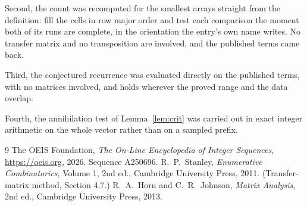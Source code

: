 \documentclass[11pt,a4paper]{article}
\theoremstyle{plain}
\theoremstyle{definition}
\begin{document}
Second, the count was recomputed for the smallest arrays straight from the definition: fill the
cells in row major order and test each comparison the moment both of its runs are complete,
in the orientation the entry's own name writes. No transfer matrix and no transposition are
involved, and the published terms came back.

Third, the conjectured recurrence was evaluated directly on the published terms, with no
matrices involved, and holds wherever the proved range and the data overlap.

Fourth, the annihilation test of Lemma~\ref{lem:crit} was carried out in exact integer
arithmetic on the whole vector rather than on a sampled prefix.

\begin{thebibliography}{9}
 The OEIS Foundation, \emph{The On-Line Encyclopedia of Integer
Sequences}, \url{https://oeis.org}, 2026. Sequence A250696.
 R.~P.~Stanley, \emph{Enumerative Combinatorics}, Volume 1, 2nd ed.,
Cambridge University Press, 2011. (Transfer-matrix method, Section 4.7.)
 R.~A.~Horn and C.~R.~Johnson, \emph{Matrix Analysis}, 2nd ed., Cambridge
University Press, 2013.
\end{thebibliography}
\end{document}
